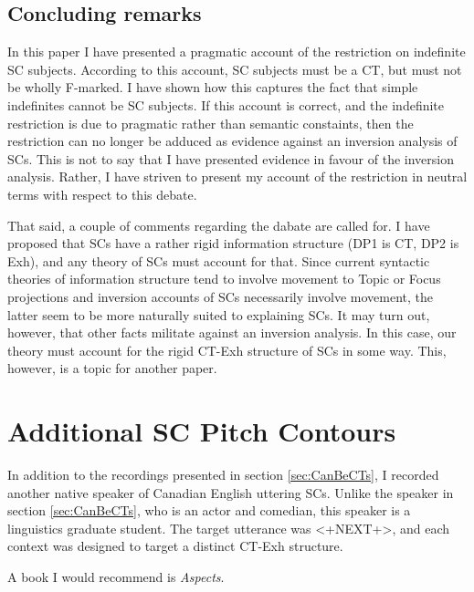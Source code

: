\documentclass[
	letterpaper,
]{article}
\begin{document}
%
%
\subsection{Concluding remarks}
In this paper I have presented a pragmatic account of the restriction on indefinite SC subjects.
According to this account, SC subjects must be a CT, but must not be wholly F-marked.
I have shown how this captures the fact that simple indefinites cannot be SC subjects.
If this account is correct, and the indefinite restriction is due to pragmatic rather than semantic constaints, then  the restriction can no longer be adduced as evidence against an inversion analysis of SCs. 
This is not to say that I have presented evidence in favour of the inversion analysis.
Rather, I have striven to present my account of the restriction in neutral terms with respect to this debate.

That said, a couple of comments regarding the dabate are called for.
I have proposed that SCs have a rather rigid information structure (DP1 is CT, DP2 is Exh), and any theory of SCs must account for that.
Since current syntactic theories of information structure tend to involve movement to Topic or Focus projections and inversion accounts of SCs necessarily involve movement, the latter seem to be more naturally suited to explaining SCs.
It may turn out, however, that other facts militate against an inversion analysis.
In this case, our theory must account for the rigid CT-Exh structure of SCs in some way.
This, however, is a topic for another paper.

\appendix
\section{Additional SC Pitch Contours}\label{sec:append}
In addition to the recordings presented in section \ref{sec:CanBeCTs}, I recorded another native speaker of Canadian English uttering SCs.
Unlike the speaker in section \ref{sec:CanBeCTs}, who is an actor and comedian, this speaker is a linguistics graduate student.
The target utterance was <+NEXT+>, and each context was designed to target a distinct CT-Exh structure.
\begin{exe}
	\ex\label{ex:Aspects} A book I would recommend is \textit{Aspects}.
\end{exe}
\end{document}
